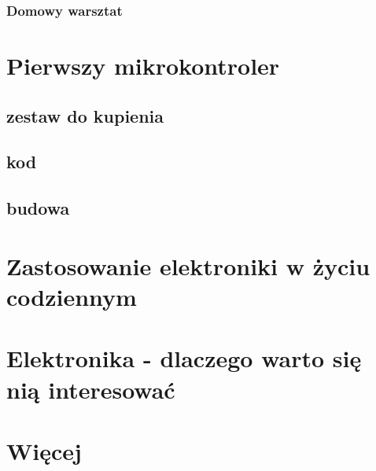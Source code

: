 	\subsection {Domowy warsztat}
    
        
        
\chapter{Pierwszy mikrokontroler}
	\section{zestaw do kupienia}
	\section{kod}
	\section{budowa}
\chapter {Zastosowanie elektroniki w życiu codziennym }
\chapter{Elektronika - dlaczego warto się nią interesować}
\chapter {Więcej}





